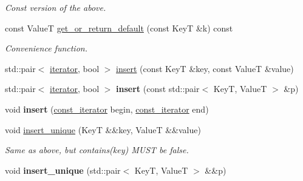 \begin{DoxyCompactItemize}
\begin{DoxyCompactList}\small\item\em Const version of the above. \end{DoxyCompactList}\item 
\hypertarget{classemlib_1_1_hash_map_aa07824c2024274ba64fdcb99e5910099}{const Value\+T \hyperlink{classemlib_1_1_hash_map_aa07824c2024274ba64fdcb99e5910099}{get\+\_\+or\+\_\+return\+\_\+default} (const Key\+T \&k) const }\label{classemlib_1_1_hash_map_aa07824c2024274ba64fdcb99e5910099}

\begin{DoxyCompactList}\small\item\em Convenience function. \end{DoxyCompactList}\item 
std\+::pair$<$ \hyperlink{classemlib_1_1_hash_map_1_1iterator}{iterator}, bool $>$ \hyperlink{classemlib_1_1_hash_map_acddefe45fc2faa18df275d409efc0071}{insert} (const Key\+T \&key, const Value\+T \&value)
\item 
\hypertarget{classemlib_1_1_hash_map_ac8378f826c1aee34ff8b94e355484700}{std\+::pair$<$ \hyperlink{classemlib_1_1_hash_map_1_1iterator}{iterator}, bool $>$ {\bfseries insert} (const std\+::pair$<$ Key\+T, Value\+T $>$ \&p)}\label{classemlib_1_1_hash_map_ac8378f826c1aee34ff8b94e355484700}

\item 
\hypertarget{classemlib_1_1_hash_map_aaedfeda4ec777d4f54cffc7cd5527be3}{void {\bfseries insert} (\hyperlink{classemlib_1_1_hash_map_1_1const__iterator}{const\+\_\+iterator} begin, \hyperlink{classemlib_1_1_hash_map_1_1const__iterator}{const\+\_\+iterator} end)}\label{classemlib_1_1_hash_map_aaedfeda4ec777d4f54cffc7cd5527be3}

\item 
\hypertarget{classemlib_1_1_hash_map_a0216dcd2527765f347b50062084c2357}{void \hyperlink{classemlib_1_1_hash_map_a0216dcd2527765f347b50062084c2357}{insert\+\_\+unique} (Key\+T \&\&key, Value\+T \&\&value)}\label{classemlib_1_1_hash_map_a0216dcd2527765f347b50062084c2357}

\begin{DoxyCompactList}\small\item\em Same as above, but contains(key) M\+U\+S\+T be false. \end{DoxyCompactList}\item 
\hypertarget{classemlib_1_1_hash_map_af4f97ca2d4507227d95e0adde3c71168}{void {\bfseries insert\+\_\+unique} (std\+::pair$<$ Key\+T, Value\+T $>$ \&\&p)}\label{classemlib_1_1_hash_map_af4f97ca2d4507227d95e0adde3c71168}


\end{DoxyCompactItemize}
